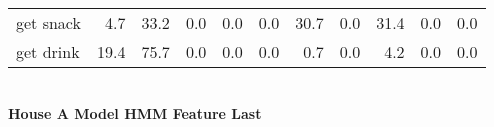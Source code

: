 \documentclass{article}
\begin{document}
\begin{sideways}
\begin{tabular}{lrrrrrrrrrr}
get snack         &         4.7 &               33.2 &               0.0 &                0.0 &                0.0 &             30.7 &                      0.0 &                  31.4 &              0.0 &              0.0 \\
get drink         &        19.4 &               75.7 &               0.0 &                0.0 &                0.0 &              0.7 &                      0.0 &                   4.2 &              0.0 &              0.0 \\
\bottomrule
\end{tabular}
\end{sideways}
\normalsize
\vspace{1cm}\\
\textbf{House A Model HMM Feature Last}\\
\vspace{1cm}\\
\end{document}
